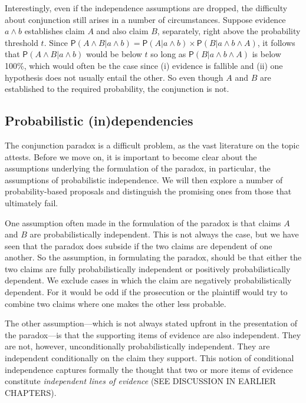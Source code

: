 \documentclass[10pt,dvipsnames,enabledeprecatedfontcommands]{scrartcl}
\newcommand{\et}{\wedge}
\newcommand{\pr}[1]{\mathsf{P}(#1)}
\begin{document}
Interestingly, even if the independence assumptions are dropped, the
difficulty about conjunction still arises in a number of circumstances.
Suppose evidence \(a\et b\) establishes claim \(A\) and also claim
\(B\), separately, right above the probability threshold \(t\). Since
\(\pr{A \wedge B | a \wedge b} =\pr{A |a \wedge b} \times \pr{B | a \wedge b \wedge A}\),
it follows that \(\pr{A \wedge B | a \wedge b}\) would be below \(t\) so
long as \(\pr{B | a \wedge b \wedge A}\) is below 100\%, which would
often be the case since (i) evidence is fallible and (ii) one hypothesis
does not usually entail the other. So even though \(A\) and \(B\) are
established to the required probability, the conjunction is not.

\hypertarget{probabilistic-independencies}{%
\subsection{Probabilistic
(in)dependencies}\label{probabilistic-independencies}}

The conjunction paradox is a difficult problem, as the vast literature
on the topic attests. Before we move on, it is important to become clear
about the assumptions underlying the formulation of the paradox, in
particular, the assumptions of probabilistic independence. We will then
explore a number of probability-based proposals and distinguish the
promising ones from those that ultimately fail.

One assumption often made in the formulation of the paradox is that
claims \(A\) and \(B\) are probabilistically independent. This is not
always the case, but we have seen that the paradox does subside if the
two claims are dependent of one another. So the assumption, in
formulating the paradox, should be that either the two claims are fully
probabilistically independent or positively probabilistically dependent.
We exclude cases in which the claim are negatively probabilistically
dependent. For it would be odd if the prosecution or the plaintiff would
try to combine two claims where one makes the other less probable.

The other assumption---which is not always stated upfront in the
presentation of the paradox---is that the supporting items of evidence
are also independent. They are not, however, unconditionally
probabilistically independent. They are independent conditionally on the
claim they support. This notion of conditional independence captures
formally the thought that two or more items of evidence constitute
\textit{independent lines of evidence} (SEE DISCUSSION IN EARLIER
CHAPTERS).
\end{document}
